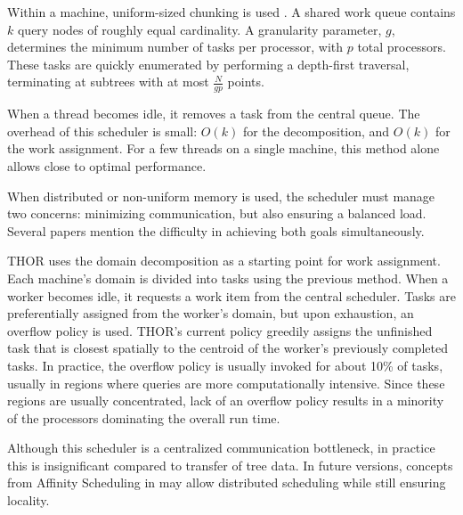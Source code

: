 \documentclass[twoside,leqno,twocolumn]{article}
\newcommand{\authornote}[1]{(\footnote{Note to self: #1})}
\newcommand{\authorsnote}[1]{\authornote{#1}}
\begin{document}

Within a machine, uniform-sized chunking is used \cite{kruskal85allocating}.
A shared work queue contains $k$ query nodes of roughly equal cardinality.
A granularity parameter, $g$, determines the minimum number of tasks per processor, with $p$ total processors.
These tasks are quickly enumerated by performing a depth-first traversal, terminating at subtrees with at most $\frac{N}{gp}$ points.

When a thread becomes idle, it removes a task from the central queue.
The overhead of this scheduler is small: $O(k)$ for the decomposition, and $O(k)$ for the work assignment.
For a few threads on a single machine, this method alone allows close to optimal performance.

When distributed or non-uniform memory is used, the scheduler must manage two concerns: minimizing communication, but also ensuring a balanced load.
Several papers \cite{markatos92using, salmon_thesis, banicescu95balancing} mention the difficulty in achieving both goals simultaneously.

THOR uses the domain decomposition as a starting point for work assignment.
Each machine's domain is divided into tasks using the previous method.
When a worker becomes idle, it requests a work item from the central scheduler.
Tasks are preferentially assigned from the worker's domain, but upon exhaustion, an overflow policy is used.
THOR's current policy greedily assigns the unfinished task that is closest spatially to the centroid of the worker's previously completed tasks.
In practice, the overflow policy is usually invoked for about 10\% of tasks, usually in regions where queries are more computationally intensive.
Since these regions are usually concentrated, lack of an overflow policy results in a minority of the processors dominating the overall run time.

Although this scheduler is a centralized communication bottleneck, in practice this is insignificant compared to transfer of tree data.
In future versions, concepts from Affinity Scheduling in \cite{markatos92using} may allow distributed scheduling while still ensuring locality.
\end{document}
